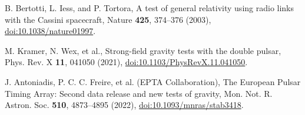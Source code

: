 \documentclass{article}
\begin{document}
\begin{thebibliography}{99}
B. Bertotti, L. Iess, and P. Tortora,
A test of general relativity using radio links with the Cassini spacecraft, 
Nature \textbf{425}, 374--376 (2003),
\href{https://doi.org/10.1038/nature01997}{doi:10.1038/nature01997}.

M. Kramer, N. Wex, et al.,
Strong-field gravity tests with the double pulsar, 
Phys. Rev. X \textbf{11}, 041050 (2021),
\href{https://doi.org/10.1103/PhysRevX.11.041050}{doi:10.1103/PhysRevX.11.041050}.


J. Antoniadis, P. C. C. Freire, et al. (EPTA Collaboration),
The European Pulsar Timing Array: Second data release and new tests of gravity,
Mon. Not. R. Astron. Soc. \textbf{510}, 4873--4895 (2022),
\href{https://doi.org/10.1093/mnras/stab3418}{doi:10.1093/mnras/stab3418}.


\end{thebibliography}
\end{document}

